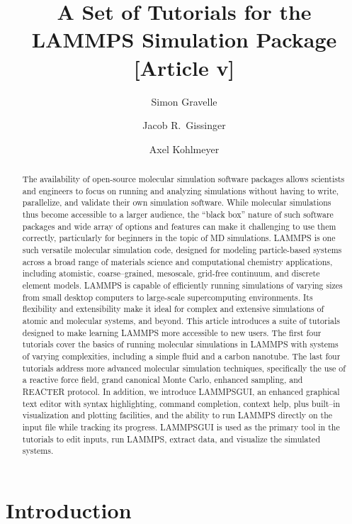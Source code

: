 \documentclass[9pt,tutorial]{livecoms}
\title{A Set of Tutorials for the LAMMPS Simulation Package [Article v\versionnumber]}
\author[1*]{Simon Gravelle}
\affil[1]{University Grenoble Alpes, CNRS, LIPhy, Grenoble, 38000, France}
\author[2]{Jacob R.~Gissinger}
\affil[2]{Stevens Institute of Technology, Hoboken, NJ 07030, USA}
\author[3]{Axel Kohlmeyer}
\affil[3]{Institute for Computational Molecular Science, Temple University, Philadelphia, PA 19122, USA}
\newcommand{\lammpsgui}{\textsf{LAMMPS\textendash GUI}}
\begin{document}
\begin{frontmatter}
\maketitle

\begin{abstract}
  The availability of open-source molecular simulation software packages
  allows scientists and engineers to focus on running and analyzing
  simulations without having to write, parallelize, and validate their
  own simulation software.  While molecular simulations thus become
  accessible to a larger audience, the ``black box'' nature of such
  software packages and wide array of options and features can make it
  challenging to use them correctly, particularly for beginners in the
  topic of MD simulations.  LAMMPS is one such versatile molecular
  simulation code, designed for modeling particle-based systems across a
  broad range of materials science and computational chemistry
  applications, including atomistic, coarse--grained, mesoscale,
  grid-free continuum, and discrete element models.  LAMMPS is capable
  of efficiently running simulations of varying sizes from small desktop
  computers to large-scale supercomputing environments.  Its flexibility
  and extensibility make it ideal for complex and extensive simulations
  of atomic and molecular systems, and beyond.  This article introduces a
  suite of tutorials designed to make learning LAMMPS more accessible to
  new users.  The first four tutorials cover the basics of running
  molecular simulations in LAMMPS with systems of varying complexities,
  including a simple fluid and a carbon nanotube.  The last four
  tutorials address more advanced molecular simulation techniques,
  specifically the use of a reactive force field, grand canonical Monte Carlo,
  enhanced sampling, and REACTER protocol.
  In addition, we introduce \lammpsgui{}, an enhanced graphical text
  editor with syntax highlighting, command completion, context help,
  plus built--in visualization and plotting facilities, and the ability
  to run LAMMPS directly on the input file while tracking its progress.
  \lammpsgui{} is used as the primary tool in the tutorials to edit
  inputs, run LAMMPS, extract data, and visualize the simulated systems.
\end{abstract}

\end{frontmatter}

\section{Introduction}
\end{document}
